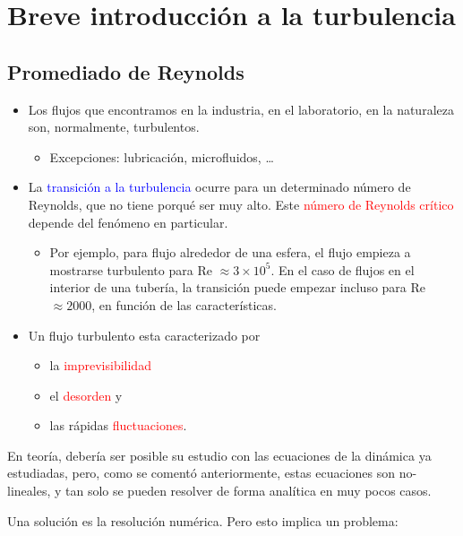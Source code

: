 \chapter[Turbulencia]{Breve introducción a la turbulencia}
\section{Promediado de Reynolds}

	
	\begin{itemize}
		\item Los flujos que encontramos en la industria, en el laboratorio, en
		la naturaleza son, normalmente, turbulentos.
		
		\begin{itemize}
			\item Excepciones: lubricación, microfluidos, \ldots{}
		\end{itemize}
		\item La \textcolor{blue}{transición a la turbulencia} ocurre para un determinado
		número de Reynolds, que no tiene porqué ser muy alto. Este \textcolor{red}{número
			de Reynolds crítico} depende del fenómeno en particular. 
		
		\begin{itemize}
			\item Por ejemplo, para flujo alrededor de una esfera, el flujo empieza
			a mostrarse turbulento para Re $\approx3\times10^{5}$. En el caso
			de flujos en el interior de una tubería, la transición puede empezar
			incluso para Re $\approx2000$, en función de las características.
		\end{itemize}
		\item Un flujo turbulento esta caracterizado por 
		
		\begin{itemize}
			\item la \textcolor{red}{imprevisibilidad}
			\item el \textcolor{red}{desorden} y 
			\item las rápidas \textcolor{red}{fluctuaciones}. 
		\end{itemize}
	\end{itemize}

	
	En teoría, debería ser posible su estudio con las ecuaciones de la
	dinámica ya estudiadas, pero, como se comentó anteriormente, estas
	ecuaciones son no-lineales, y tan solo se pueden resolver de forma
	analítica en muy pocos casos.
	
	Una solución es la resolución numérica. Pero esto implica un problema:
	
